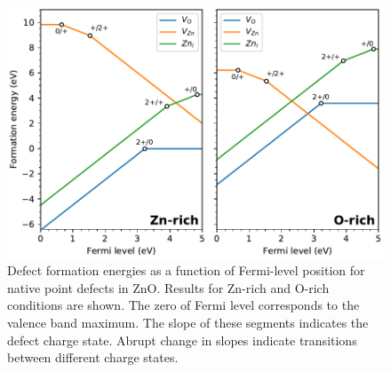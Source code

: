 \begin{figure}[tbh!]
	\centering
	\includegraphics[width=0.65\linewidth]{"images/rnd/defect-formation"}
	\caption[Defect formation energies as a function of Fermi-level position for native point defects in ZnO]{Defect formation energies as a function of Fermi-level position for native point defects in ZnO. Results for Zn-rich and O-rich conditions are shown. The zero of Fermi level corresponds to the valence band maximum. The slope of these segments indicates the defect charge state. Abrupt change in slopes indicate transitions between different charge states.}
\end{figure}

